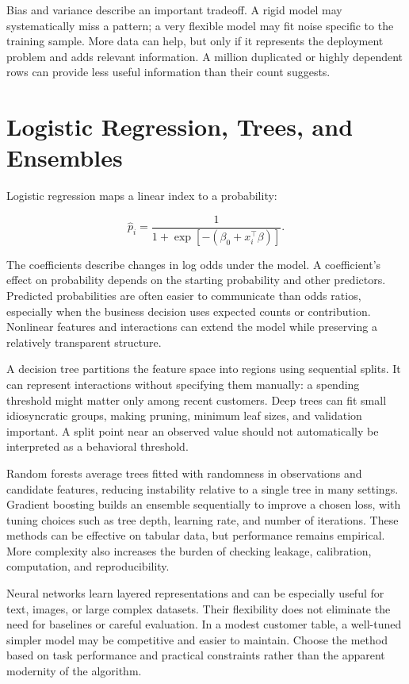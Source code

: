 Bias and variance describe an important tradeoff. A rigid model may
systematically miss a pattern; a very flexible model may fit noise
specific to the training sample. More data can help, but only if it
represents the deployment problem and adds relevant information. A
million duplicated or highly dependent rows can provide less useful
information than their count suggests.

\hypertarget{M07-logistic-regression-trees-and-ensembles}{%
\section{Logistic Regression, Trees, and
Ensembles}\label{M07-logistic-regression-trees-and-ensembles}}

\noindent Logistic regression maps a linear index to a probability:

\[
\hat p_i=\frac{1}{1+\exp[-(\beta_0+x_i^\top\beta)]}.
\]

The coefficients describe changes in log odds under the model. A
coefficient's effect on probability depends on the starting probability
and other predictors. Predicted probabilities are often easier to
communicate than odds ratios, especially when the business decision uses
expected counts or contribution. Nonlinear features and interactions can
extend the model while preserving a relatively transparent structure.

A decision tree partitions the feature space into regions using
sequential splits. It can represent interactions without specifying them
manually: a spending threshold might matter only among recent customers.
Deep trees can fit small idiosyncratic groups, making pruning, minimum
leaf sizes, and validation important. A split point near an observed
value should not automatically be interpreted as a behavioral threshold.

Random forests average trees fitted with randomness in observations and
candidate features, reducing instability relative to a single tree in
many settings. Gradient boosting builds an ensemble sequentially to
improve a chosen loss, with tuning choices such as tree depth, learning
rate, and number of iterations. These methods can be effective on
tabular data, but performance remains empirical. More complexity also
increases the burden of checking leakage, calibration, computation, and
reproducibility.

Neural networks learn layered representations and can be especially
useful for text, images, or large complex datasets. Their flexibility
does not eliminate the need for baselines or careful evaluation. In a
modest customer table, a well-tuned simpler model may be competitive and
easier to maintain. Choose the method based on task performance and
practical constraints rather than the apparent modernity of the
algorithm.

